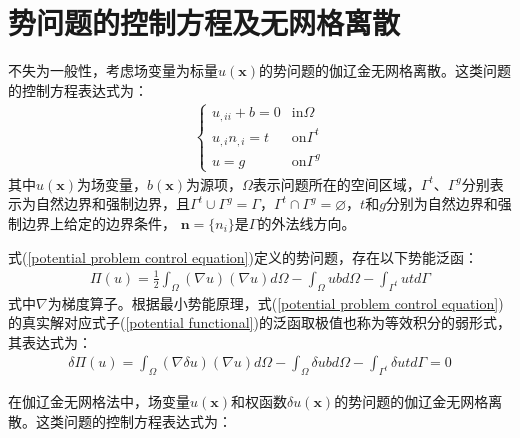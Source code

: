 \documentclass[a4paper]{ctexbook}
\begin{document}
\section{势问题的控制方程及无网格离散}
不失为一般性，考虑场变量为标量$u(\pmb{x})$的势问题的伽辽金无网格离散。这类问题的控制方程表达式为：
\begin{equation}\label{potential problem control equation}
\begin{split}
\begin{cases}
    u_{,ii}+b=0&\text{in}\Omega\\
    u_{,i}n_{,i}=t&\text{on}\Gamma^t\\
    u=g&\text{on}\Gamma^g
\end{cases}
\end{split}
\end{equation}
其中$u(\pmb{x})$为场变量，$b(\pmb{x})$为源项，$\Omega$表示问题所在的空间区域，$\Gamma^t、\Gamma^g$分别表示为自然边界和强制边界，且$\Gamma^t\cup \Gamma^g=\Gamma，\Gamma^t\cap \Gamma^g=\varnothing$，$t$和$g$分别为自然边界和强制边界上给定的边界条件，
$\pmb{n}=\{n_i\}$是$\Gamma$的外法线方向。\par
式(\ref{potential problem control equation})定义的势问题，存在以下势能泛函：
\begin{equation}\label{potential functional}
\begin{split}
    \Pi(u)=\frac{1}{2}\int_{\Omega}(\nabla u)(\nabla u)d\Omega-\int_{\Omega}ubd\Omega-\int_{\Gamma^t}utd\Gamma
\end{split}
\end{equation}
式中$\nabla$为梯度算子。根据最小势能原理，式(\ref{potential problem control equation})的真实解对应式子(\ref{potential functional})的泛函取极值也称为等效积分的弱形式，其表达式为：
\begin{equation}\label{weak form}
\begin{split}
    \delta \Pi(u)=\int_{\Omega}(\nabla \delta u)(\nabla u)d\Omega-\int_{\Omega}\delta ubd\Omega-\int_{\Gamma^t}\delta utd\Gamma=0
\end{split}
\end{equation}\par
在伽辽金无网格法中，场变量$u(\pmb{x})$和权函数$\delta u(\pmb{x})$的势问题的伽辽金无网格离散。这类问题的控制方程表达式为：
\end{document}
